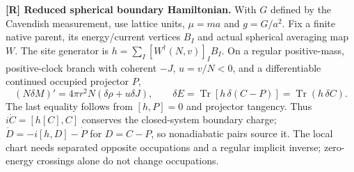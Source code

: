 \noindent\textbf{[R] Reduced spherical boundary Hamiltonian.}
With $G$ defined by the Cavendish measurement, use lattice units,
$\mu=ma$ and $g=G/a^2$.
Fix a finite native parent, its energy/current vertices $B_I$ and actual
spherical averaging map $W$. The site generator is
$h=\sum_I[W^\dagger(N,v)]_I B_I$.
On a regular positive-mass, positive-clock branch with coherent $-J$,
$u=v/N<0$, and a differentiable continued occupied projector $P$,
\[
 (N\delta M)'=4\pi r^2N(\delta\rho+u\delta J),\qquad
 \delta E=\operatorname{Tr}[h\,\delta(C-P)]
          =\operatorname{Tr}(h\,\delta C).
\]
The last equality follows from $[h,P]=0$ and projector tangency.
Thus $i\dot C=[h[C],C]$ conserves the closed-system boundary charge;
$\dot D=-i[h,D]-\dot P$ for $D=C-P$, so nonadiabatic pairs source it.
The local chart needs separated opposite occupations and a regular
implicit inverse; zero-energy crossings alone do not change occupations.

